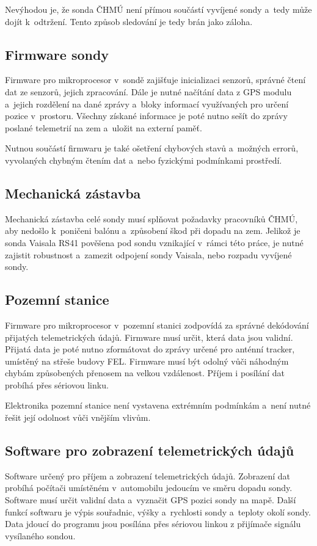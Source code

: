 \documentclass[twoside]{ctuthesis}
\theoremstyle{plain}
\theoremstyle{definition}
\theoremstyle{note}
\begin{document}
				Nevýhodou je, že sonda ČHMÚ není přímou součástí vyvíjené sondy a~tedy může dojít k~odtržení. Tento způsob sledování je tedy brán jako záloha.


		
		\subsection{Firmware sondy}
		Firmware pro mikroprocesor v~sondě zajišťuje inicializaci senzorů, správné čtení dat ze senzorů, jejich zpracování. Dále je nutné načítání data z GPS modulu a~jejich rozdělení na dané zprávy a~bloky informací využívaných pro určení pozice v~prostoru. Všechny získané informace je poté nutno sešít do zprávy poslané telemetrií na zem a~uložit na externí paměť. 

		Nutnou součástí firmwaru je také ošetření chybových stavů a~možných errorů, vyvolaných chybným čtením dat a~nebo fyzickými podmínkami prostředí.

		\subsection{Mechanická zástavba}
		Mechanická zástavba celé sondy musí splňovat požadavky pracovníků ČHMÚ, aby nedošlo k~poničeni balónu a~způsobení škod při dopadu na zem. Jelikož je sonda Vaisala RS41 pověšena pod sondu vznikající v~rámci této práce, je nutné zajistit robustnost a~zamezit odpojení sondy Vaisala, nebo rozpadu vyvíjené sondy.



		\subsection{Pozemní stanice}
		\label{sec:navrh:pozemni_stanice}
		Firmware pro mikroprocesor v~pozemní stanici zodpovídá za správné dekódování přijatých telemetrických údajů. Firmware musí určit, která data jsou validní. Přijatá data je poté nutno zformátovat do zprávy určené pro anténní tracker, umístěný na střeše budovy FEL. Firmware musí být odolný vůči náhodným chybám způsobených přenosem na velkou vzdálenost. Příjem i posílání dat probíhá přes sériovou linku. 

		Elektronika pozemní stanice není vystavena extrémním podmínkám a~není nutné řešit její odolnost vůči vnějším vlivům. 


		\subsection{Software pro zobrazení telemetrických údajů}
		Software určený pro příjem a zobrazení telemetrických údajů. Zobrazení dat probíhá počítači umístěném v~automobilu jedoucím ve směru dopadu sondy. Software musí určit validní data a~vyznačit GPS pozici sondy na mapě. Další funkcí softwaru je výpis souřadnic, výšky a~rychlosti sondy a~teploty okolí sondy. Data jdoucí do programu jsou posílána přes sériovou linkou z přijímače signálu vysílaného sondou. 
\end{document}
